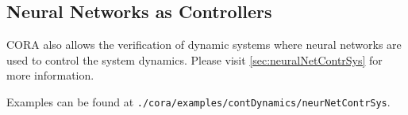 \subsection{Neural Networks as Controllers}
\label{sec:neuralNetworkClosedLoop}

CORA also allows the verification of dynamic systems where neural networks are used to control the system dynamics.
Please visit \cref{sec:neuralNetContrSys} for more information.

Examples can be found at \texttt{./cora/examples/contDynamics/neurNetContrSys}.
